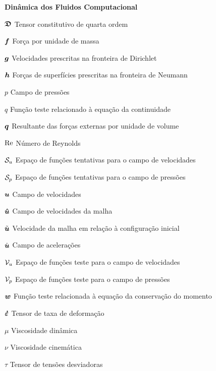 \begin{simbolos}
    \item[\textbf{Dinâmica dos Fluidos Computacional}]
    \item[$\boldsymbol{\mathfrak{D}}$] Tensor constitutivo de quarta ordem
    \item[$\boldsymbol{f}$] Força por unidade de massa
    \item[$\boldsymbol{g}$] Velocidades prescritas na fronteira de Dirichlet
    \item[$\boldsymbol{h}$] Forças de superfícies prescritas na fronteira de Neumann
    \item[$p$] Campo de pressões
    \item[$q$] Função teste relacionado à equação da continuidade
    \item[$\boldsymbol{q}$] Resultante das forças externas por unidade de volume
    \item[$\mathrm{Re}$] Número de Reynolds
    \item[$\mathcal{S}_u$] Espaço de funções tentativas para o campo de velocidades
    \item[$\mathcal{S}_p$] Espaço de funções tentativas para o campo de pressões
    \item[$\boldsymbol{u}$] Campo de velocidades
    \item[$\boldsymbol{\hat{u}}$] Campo de velocidades da malha
    \item[$\tilde{\boldsymbol{u}}$] Velocidade da malha em relação à configuração inicial
    \item[$\dot{\boldsymbol{u}}$] Campo de acelerações
    \item[$\mathcal{V}_u$] Espaço de funções teste para o campo de velocidades
    \item[$\mathcal{V}_p$] Espaço de funções teste para o campo de pressões
    \item[$\boldsymbol{w}$] Função teste relacionada à equação da conservação do momento
    \item[$\boldsymbol{\dot{\varepsilon}}$] Tensor de taxa de deformação
    \item[$\mu$] Viscosidade dinâmica
    \item[$\nu$] Viscosidade cinemática
    \item[$\tau$] Tensor de tensões desviadoras


\end{simbolos}
